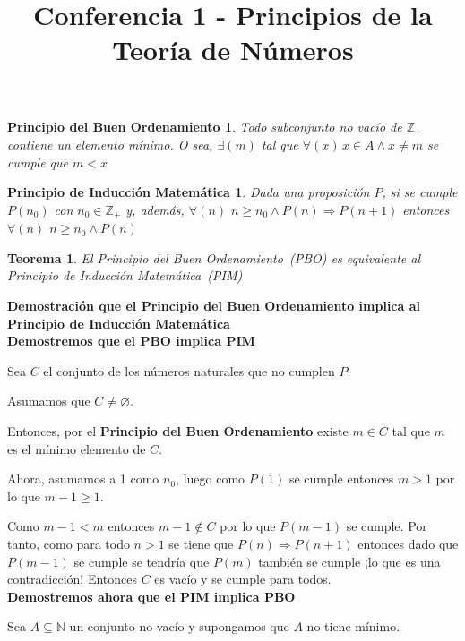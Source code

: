 \documentclass[a4paper,1pt]{report}
\title{Conferencia 1 - Principios de la Teoría de Números}
\author{}
\newtheorem*{pbo}{Principio del Buen Ordenamiento}
\newtheorem*{pim}{Principio de Inducción Matemática}
\newtheorem*{teo}{Teorema}
\begin{document}
\maketitle


\begin{pbo}

Todo subconjunto no vacío de $\mathbb{Z}_{+}$ contiene un elemento mínimo. O sea,
$\exists(m)$ tal que $\forall(x)\, x\in A\wedge x\neq m$ se cumple que $m<x$
\end{pbo}

\begin{pim}
 Dada una proposición $P$, si se cumple $P(n_0)$ con $n_0\in \mathbb{Z}_{+}$ y, además, 
 $\forall(n)$ $n\geq n_0\wedge P(n) \Rightarrow P(n+1)$ entonces $\forall(n)$ $n\geq n_0 \wedge P(n)$
\end{pim}

\begin{teo}
 El Principio del Buen Ordenamiento~(PBO) es equivalente al Principio de Inducción Matemática~(PIM)
\end{teo}

\textbf{Demostración que  el Principio del Buen Ordenamiento implica al Principio de Inducción Matemática}\\

\textbf{Demostremos que el PBO implica PIM}

Sea $C$ el conjunto de los números naturales que no cumplen $P$. 

Asumamos que $C\neq \varnothing$. 

Entonces, por el \textbf{Principio del Buen Ordenamiento} existe $m\in C$ tal que $m$ es el mínimo elemento de $C$.

Ahora, asumamos a 1 como $n_0$, luego como $P(1)$ se cumple entonces $m>1$ por lo que $m-1\geq 1$.

Como $m-1<m$ entonces $m-1\notin C$ por lo que $P(m-1)$ se cumple. Por tanto, como para todo $n>1$ se tiene que $P(n)\Rightarrow P(n+1)$ entonces dado que $P(m-1)$ se cumple se tendría que $P(m)$ también se cumple ¡lo que es una contradicción! Entonces $C$ es vacío y se cumple para todos.\\

\textbf{Demostremos ahora que el PIM implica PBO}

Sea $A\subseteq\mathbb{N}$ un conjunto no vacío y supongamos que $A$ no tiene mínimo.
\end{document}

